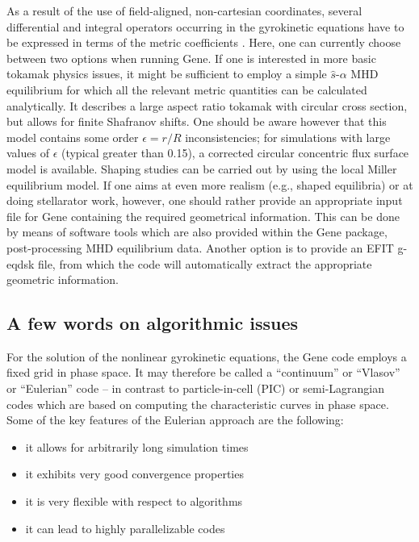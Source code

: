 \documentclass[12pt]{article}
\begin{document}
As a result of the use of field-aligned, non-cartesian
coordinates, several differential and integral operators occurring
in the gyrokinetic equations have to be expressed in terms of the
metric coefficients \cite{tracer}. Here, one can currently choose
between two options when running {\sc Gene}. If one is interested
in more basic tokamak physics issues, it might be sufficient to
employ a simple $\hat s$-$\alpha$ MHD equilibrium for which all
the relevant metric quantities can be calculated analytically. It
describes a large aspect ratio tokamak with circular cross
section, but allows for finite Shafranov shifts. One should be aware however
that this model contains some order $\epsilon=r/R$ inconsistencies; for 
simulations with large values of $\epsilon$ (typical greater than 0.15),
a corrected circular concentric flux surface model is available. Shaping
studies can be carried out by using the local Miller equilibrium model. If one 
aims at even more realism (e.g., shaped equilibria) or at doing stellarator
work, however, one should rather provide an appropriate input file
for {\sc Gene} containing the required geometrical information.
This can be done by means of software tools which are also
provided within the {\sc Gene} package, post-processing MHD
equilibrium data. 
Another option is to provide an EFIT g-eqdsk file, from which the 
code will automatically extract the appropriate geometric information.


\subsection{A few words on algorithmic issues}

For the solution of the nonlinear gyrokinetic equations, the {\sc Gene} code employs a fixed grid
in phase space. It may therefore be called a ``continuum'' or ``Vlasov'' or ``Eulerian'' code --
in contrast to particle-in-cell (PIC) or semi-Lagrangian codes which are based on computing the
characteristic curves in phase space. Some of the key features of the Eulerian approach are the
following:
\begin{itemize}
\item it allows for arbitrarily long simulation times
\item it exhibits very good convergence properties
\item it is very flexible with respect to algorithms
\item it can lead to highly parallelizable codes
\end{itemize}
\end{document}
